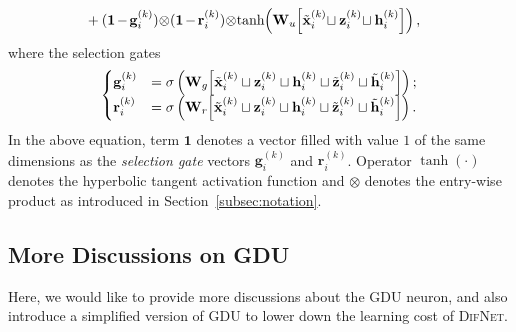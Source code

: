 \documentclass{article}
\newcommand{\mb}{\mathbf}
\newcommand{\our}{\textsc{DifNet}}
\newcommand{\gdu}{\textsc{GDU}}
\begin{document}
\begin{equation}
\begin{aligned}
&+ (\mb{1}  \hspace{-1pt} -  \hspace{-1pt} \mb{g}_i^{(k)}) \hspace{-2pt} \otimes \hspace{-2pt} (\mb{1}  \hspace{-1pt} -  \hspace{-1pt} \mb{r}_i^{(k)})  \hspace{-2pt}  \otimes  \hspace{-2pt} \tanh  \hspace{-2pt} \left(\mb{W}_u  \hspace{-2pt} \left[\tilde{\mb{x}}_i^{(k)} \hspace{-2pt} \sqcup \mb{z}_i^{(k)}  \hspace{-2pt} \sqcup \mb{h}_i^{(k)} \right] \right),
\end{aligned}
\end{equation}
where the selection gates
\begin{equation}\label{equ:selection_gate}
\begin{cases}
\mb{g}_i^{(k)}  &= \sigma \left( \mb{W}_g  \hspace{-2pt} \left[\tilde{\mb{x}}_i^{(k)}  \sqcup \mb{z}_i^{(k)} \sqcup \mb{h}_i^{(k)}  \sqcup \tilde{\mb{z}}_i^{(k)} \sqcup \tilde{\mb{h}}_i^{(k)} \right] \right); \\
\mb{r}_i^{(k)} &= \sigma \left( \mb{W}_r  \hspace{-2pt} \left[\tilde{\mb{x}}_i^{(k)}  \sqcup \mb{z}_i^{(k)} \sqcup \mb{h}_i^{(k)} \sqcup \tilde{\mb{z}}_i^{(k)} \sqcup \tilde{\mb{h}}_i^{(k)} \right] \right).
\end{cases}
\end{equation}\endgroup
In the above equation, term $\mb{1}$ denotes a vector filled with value $1$ of the same dimensions as the \textit{selection gate} vectors $\mb{g}_i^{(k)}$ and $\mb{r}_i^{(k)}$. Operator $\tanh(\cdot)$ denotes the hyperbolic tangent activation function and $\otimes$ denotes the entry-wise product as introduced in Section~\ref{subsec:notation}.




\subsection{More Discussions on {\gdu}}

Here, we would like to provide more discussions about the {\gdu} neuron, and also introduce a simplified version of {\gdu} to lower down the learning cost of {\our}.
\end{document}
